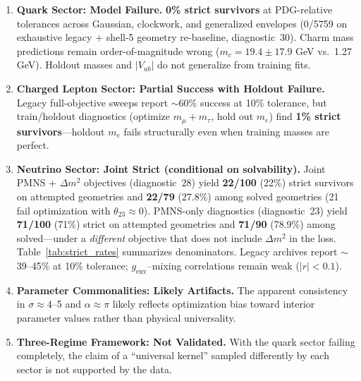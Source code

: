 \documentclass[12pt,a4paper]{article}
\begin{document}
\begin{enumerate}
\item \textbf{Quark Sector: Model Failure.} \textbf{0\% strict survivors} at PDG-relative tolerances across Gaussian, clockwork, and generalized envelopes (0/5759 on exhaustive legacy + shell-5 geometry re-baseline, diagnostic~30). Charm mass predictions remain order-of-magnitude wrong ($m_c = 19.4 \pm 17.9$ GeV vs.\ 1.27 GeV). Holdout masses and $|V_{ub}|$ do not generalize from training fits.

\item \textbf{Charged Lepton Sector: Partial Success with Holdout Failure.} Legacy full-objective sweeps report $\sim$60\% success at 10\% tolerance, but train/holdout diagnostics (optimize $m_\mu + m_\tau$, hold out $m_e$) find \textbf{1\% strict survivors}---holdout $m_e$ fails structurally even when training masses are perfect.

\item \textbf{Neutrino Sector: Joint Strict (conditional on solvability).} Joint PMNS + $\Delta m^2$ objectives (diagnostic~28) yield \textbf{22/100} (22\%) strict survivors on attempted geometries and \textbf{22/79} (27.8\%) among solved geometries (21 fail optimization with $\theta_{23}\approx 0$). PMNS-only diagnostics (diagnostic~23) yield \textbf{71/100} (71\%) strict on attempted geometries and \textbf{71/90} (78.9\%) among solved---under a \emph{different} objective that does not include $\Delta m^2$ in the loss. Table~\ref{tab:strict_rates} summarizes denominators. Legacy archives report $\sim$39--45\% at 10\% tolerance; $g_{\text{env}}$--mixing correlations remain weak ($|r| < 0.1$).

\item \textbf{Parameter Commonalities: Likely Artifacts.} The apparent consistency in $\sigma \approx 4$--5 and $\alpha \approx \pi$ likely reflects optimization bias toward interior parameter values rather than physical universality.

\item \textbf{Three-Regime Framework: Not Validated.} With the quark sector failing completely, the claim of a ``universal kernel'' sampled differently by each sector is not supported by the data.
\end{enumerate}
\end{document}
